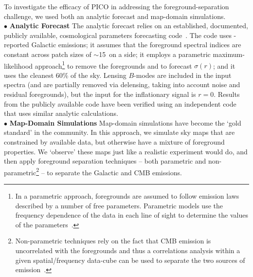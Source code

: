\documentclass[PICOReport.tex]{subfiles}
\begin{document}
To investigate the efficacy of PICO in addressing the foreground-separation challenge, we used both an analytic forecast and map-domain simulations. \\ 
%
\noindent$\bullet$ {\bf Analytic Forecast} \hspace{0.1in} The analytic forecast relies on an established, documented, publicly available, cosmological parameters forecasting code~\citep{errard_and_finney}. The code uses \planck -reported Galactic emissions; it assumes that the foreground spectral indices are constant across patch sizes of $\sim$15\degree\ on a side; it employs a parametric maximum-likelihood approach\footnote{In a parametric approach, foregrounds are assumed to follow emission laws described by a number of free parameters. Parametric models use the frequency dependence of the data in each line of sight to determine the values of the parameters~\citep{eriksen/etal:2008}.} to remove the foregrounds and to forecast $\sigma(r)$; and it uses the cleanest 60\% of the sky. Lensing $B$-modes are included in the input spectra (and are partially removed via delensing, taking into account noise and residual foregrounds), but the input for the inflationary signal is $r=0$.  Results from the publicly available code have been verified using an independent code that uses similar analytic calculations.  \\
%
%
\noindent$\bullet$ {\bf Map-Domain Simulations} \hspace{0.1in} Map-domain simulations have become the `gold standard' in the community. In this approach, we simulate sky maps that are constrained by available data, but otherwise have a mixture of foreground properties. We `observe' these maps just like a realistic experiment would do, and then apply foreground separation techniques -- both parametric and non-parametric\footnote{\label{nonparametric}Non-parametric techniques rely on the fact that CMB emission is uncorrelated with the foregrounds and thus a correlations analysis within a given spatial/frequency data-cube can be used to separate the two sources of emission~\citep{delabrouille2003,Cardoso2008,Delabrouille2009,nilc,gnilc}.} -- to separate the Galactic and CMB emissions. 
\end{document}
